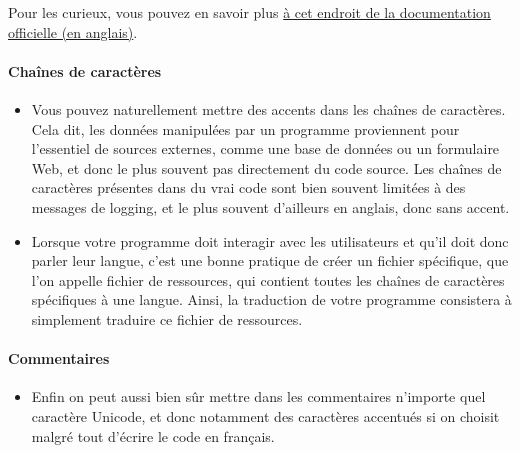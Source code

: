 Pour les curieux, vous pouvez en savoir plus
\href{https://docs.python.org/3/reference/lexical_analysis.html\#identifiers}{à
cet endroit de la documentation officielle (en anglais)}.

    \hypertarget{chauxeenes-de-caractuxe8res}{%
\paragraph{Chaînes de caractères}\label{chauxeenes-de-caractuxe8res}}

    \begin{itemize}
\item
  Vous pouvez naturellement mettre des accents dans les chaînes de
  caractères. Cela dit, les données manipulées par un programme
  proviennent pour l'essentiel de sources externes, comme une base de
  données ou un formulaire Web, et donc le plus souvent pas directement
  du code source. Les chaînes de caractères présentes dans du vrai code
  sont bien souvent limitées à des messages de logging, et le plus
  souvent d'ailleurs en anglais, donc sans accent.
\item
  Lorsque votre programme doit interagir avec les utilisateurs et qu'il
  doit donc parler leur langue, c'est une bonne pratique de créer un
  fichier spécifique, que l'on appelle fichier de ressources, qui
  contient toutes les chaînes de caractères spécifiques à une langue.
  Ainsi, la traduction de votre programme consistera à simplement
  traduire ce fichier de ressources.
\end{itemize}

    \begin{Shaded}
\begin{Highlighting}[frame=lines,framerule=0.6mm,rulecolor=\color{asisframecolor}]
\OperatorTok{=} 
\end{Highlighting}
\end{Shaded}

    \hypertarget{commentaires}{%
\paragraph{Commentaires}\label{commentaires}}

    \begin{itemize}
\tightlist
\item
  Enfin on peut aussi bien sûr mettre dans les commentaires n'importe
  quel caractère Unicode, et donc notamment des caractères accentués si
  on choisit malgré tout d'écrire le code en français.
\end{itemize}

